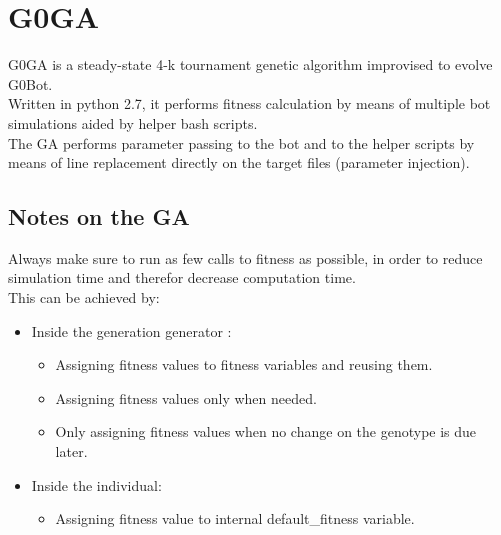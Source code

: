 \documentclass[12pt]{scrartcl}
\begin{document}
		\section*{G0GA}
		G0GA is a steady-state 4-k tournament genetic algorithm improvised to evolve G0Bot.\\
		Written in python 2.7, it performs fitness calculation by means of multiple bot simulations aided by helper bash scripts.\\
		The GA performs parameter passing to the bot and to the helper scripts by means of line replacement directly on the target files (parameter injection).\\
		\subsection*{Notes on the GA}
		Always make sure to run as few calls to fitness as possible, in order to reduce simulation time and therefor decrease computation time.\\
		This can be achieved by:\\
			\begin{itemize}
				\item Inside the generation generator	: 
				\begin{itemize}
					\item Assigning fitness values to fitness variables and reusing them.
					\item Assigning fitness values only when needed.
					\item Only assigning fitness values when no change on the genotype is due later.
				\end{itemize}
				\item Inside the individual: 
				\begin{itemize}
					\item Assigning fitness value to internal default\_fitness variable.
				\end{itemize}
			\end{itemize}
	
	\newpage
\end{document}
